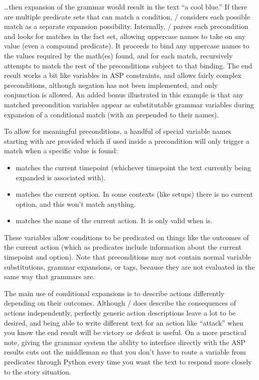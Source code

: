 \ldots then expansion of the grammar \prq{[[color]]}{} would result in the text ``a cool blue.''
%
If there are multiple predicate sets that can match a condition, \dunyazad/ considers each possible match as a separate expansion possibility.
%
Internally, \dunyazad/ parses each precondition and looks for matches in the fact set, allowing uppercase names to take on any value (even a compound predicate).
%
It proceeds to bind any uppercase names to the values required by the math(es) found, and for each match, recursively attempts to match the rest of the preconditions subject to that binding.
%
The end result works a bit like variables in ASP constraints, and allows fairly complex preconditions, although negation has not been implemented, and only conjunction is allowed.
%
An added bonus illustrated in this example is that any matched precondition variables appear as substitutable grammar variables during expansion of a conditional match (with an \exchar{\_} prepended to their names).


To allow for meaningful preconditions, a handful of special variable names starting with \exchar{\_} are provided which if used inside a precondition will only trigger a match when a specific value is found:
%
\begin{itemize}
  \item {} matches the current timepoint (whichever timepoint the text currently being expanded is associated with).
  \item {} matches the current option. In some contexts (like setups) there is no current option, and this won't match anything.
  \item {} matches the name of the current action. It is only valid when  is.
\end{itemize}
%
These variables allow conditions to be predicated on things like the outcomes of the current action (which as predicates include information about the current timepoint and option).
%
Note that preconditions may not contain normal variable substitutions, grammar expansions, or tags, because they are not evaluated in the same way that grammars are.


The main use of conditional expansions is to describe actions differently depending on their outcomes.
%
Although \dunyazad/ does describe the consequences of actions independently, perfectly generic action descriptions leave a lot to be desired, and being able to write different text for an action like ``attack'' when you know the end result will be victory or defeat is useful.
%
On a more practical note, giving the grammar system the ability to interface directly with the ASP results cuts out the middleman so that you don't have to route a variable from predicates through Python every time you want the text to respond more closely to the story situation.


